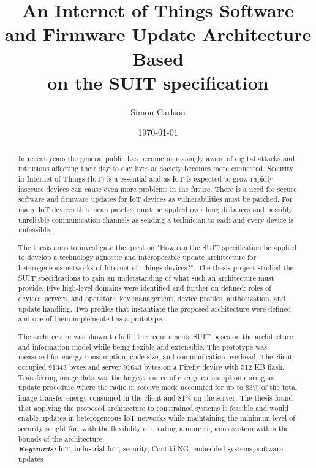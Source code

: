 \documentclass{kththesis}
\title{An Internet of Things Software and Firmware Update Architecture Based\\on the SUIT specification}
\author{Simon Carlson}
\date{\today}
\providecommand{\keywords}[1]{\textbf{\textit{Keywords:}} #1}
\begin{document}
\frontmatter

\titlepage

\begin{abstract}
In recent years the general public has become increasingly aware of digital attacks and
intrusions affecting their day to day lives as society becomes more connected. Security in
Internet of Things (IoT) is a essential and as IoT is expected to grow rapidly insecure
devices can cause even more problems in the future. There is a need for secure software
and firmware updates for IoT devices as vulnerabilities must be patched. For many IoT
devices this mean patches must be applied over long distances and possibly unreliable
communication channels as sending a technician to each and every device is unfeasible. 

The thesis aims to investigate the question "How can the SUIT specification be applied to
develop a technology agnostic and interoperable update architecture for heterogeneous
networks of Internet of Things devices?". The thesis project studied the SUIT
specifications to gain an understanding of what such an architecture must provide. Five
high-level domains were identified and further on defined: roles of devices, servers, and
operators, key management, device profiles, authorization, and update handling. Two
profiles that instantiate the proposed architecture were defined and one of them
implemented as a prototype. 

The architecture was shown to fulfill the requirements SUIT poses on the architecture and
information model while being flexible and extensible. The prototype was measured for
energy consumption, code size, and communication overhead. The client occupied 91343 bytes
and server 91643 bytes on a Firefly device with 512 KB flash. Transferring image data was
the largest source of energy consumption during an update procedure where the radio in
receive mode accounted for up to 83\% of the total image transfer energy consumed in the
client and 81\% on the server. The thesis found that applying the proposed architecture to
constrained systems is feasible and would enable updates in heterogeneous IoT networks
while maintaining the minimum level of security sought for, with the flexibility of
creating a more rigorous system within the bounds of the architecture.\\

\noindent\keywords{IoT, industrial IoT, security, Contiki-NG, embedded systems, 
                    software updates}
\end{abstract}
\end{document}

